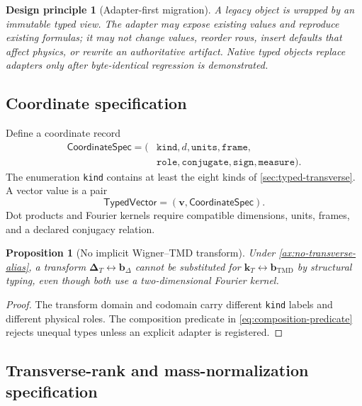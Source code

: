 \documentclass[11pt]{article}
\newtheorem{principle}[definition]{Design principle}
\newtheorem{proposition}[definition]{Proposition}
\newcommand{\kT}{\bm{k}_{T}}
\newcommand{\DT}{\bm{\Delta}_{T}}
\newcommand{\bD}{\bm{b}_{\Delta}}
\newcommand{\bM}{\bm{b}_{\mathrm{TMD}}}
\begin{document}
\begin{principle}[Adapter-first migration]
\label{prin:adapter-first}
A legacy object is wrapped by an immutable typed view.  The adapter may
expose existing values and reproduce existing formulas; it may not change
values, reorder rows, insert defaults that affect physics, or rewrite an
authoritative artifact.  Native typed objects replace adapters only after
byte-identical regression is demonstrated.
\end{principle}

\subsection{Coordinate specification}

Define a coordinate record
\begin{equation}
\begin{aligned}
 \mathsf{CoordinateSpec}=(&\texttt{kind},d,\texttt{units},\texttt{frame},\\
 &\texttt{role},\texttt{conjugate},\texttt{sign},\texttt{measure}).
\end{aligned}
\label{eq:coordinate-spec}
\end{equation}
The enumeration \texttt{kind} contains at least the eight kinds of
\cref{sec:typed-transverse}.  A vector value is a pair
\begin{equation}
 \mathsf{TypedVector}=(\bm v,\mathsf{CoordinateSpec}).
\label{eq:typed-vector}
\end{equation}
Dot products and Fourier kernels require compatible dimensions, units,
frames, and a declared conjugacy relation.

\begin{proposition}[No implicit Wigner--TMD transform]
\label{prop:no-implicit-wigner-tmd}
Under \cref{ax:no-transverse-alias}, a transform
\(\DT\leftrightarrow\bD\) cannot be substituted for
\(\kT\leftrightarrow\bM\) by structural typing, even though both use a
two-dimensional Fourier kernel.
\end{proposition}

\begin{proof}
The transform domain and codomain carry different \texttt{kind} labels and
different physical roles.  The composition predicate in
\cref{eq:composition-predicate} rejects unequal types unless an explicit
adapter is registered.
\end{proof}

\subsection{Transverse-rank and mass-normalization specification}
\end{document}

